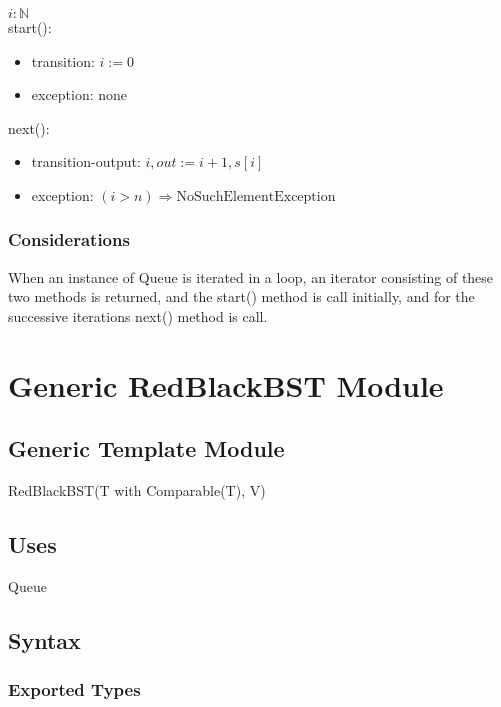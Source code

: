\documentclass[12pt]{article}
\begin{document}
$i: \mathbb{N}$\\

\noindent start():
\begin{itemize}
\item transition: $i := 0$
\item exception: none
\end{itemize}

\noindent next():
\begin{itemize}
\item transition-output: $i, out := i + 1, s[i]$
\item exception: $( i > n) \Rightarrow \text{NoSuchElementException}$
\end{itemize}

\subsubsection* {Considerations}

When an instance of Queue is iterated in a loop, an iterator consisting of these two methods is returned, 
and the start() method is call initially, and for the successive iterations next() method is call.\\

\newpage

\section* {Generic RedBlackBST Module}

\subsection*{Generic Template Module}

RedBlackBST(T with Comparable(T), V)

\subsection* {Uses}

Queue

\subsection* {Syntax}

\subsubsection* {Exported Types}
\end{document}
